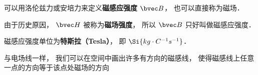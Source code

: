 
\begin{issues}
\issueDraft
\end{issues}

可以用洛伦兹力或安培力来定义\textbf{磁感应强度} $\bvec B$， 也可以直接称为磁场．

由于历史原因， $\bvec H$ 被称为\textbf{磁场强度}， 所以 $\bvec B$ 只好叫做磁感应强度．

磁感应强度单位为\textbf{特斯拉（Tesla）}， 即 $\Si{kg\cdot C^{-1}s^{-1}}$．

与电场线一样， 我们可以在空间中画出许多有方向的磁感线， 使得磁感线上任意一点的方向等于该点处磁场的方向
